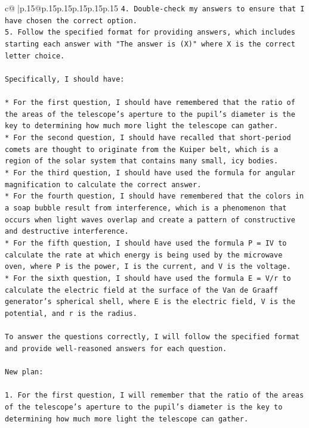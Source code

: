 \documentclass{article}
\begin{document}
{\begin{supertabular}{c@{$\;$}|p{.15\linewidth}@{}p{.15\linewidth}p{.15\linewidth}p{.15\linewidth}p{.15\linewidth}p{.15\linewidth}}
{{{\texttt{4. Double{-}check my answers to ensure that I have chosen the correct option.} \\
\texttt{5. Follow the specified format for providing answers, which includes starting each answer with "The answer is (X)" where X is the correct letter choice.} \\
\\ 
\texttt{Specifically, I should have:} \\
\\ 
\texttt{* For the first question, I should have remembered that the ratio of the areas of the telescope's aperture to the pupil's diameter is the key to determining how much more light the telescope can gather.} \\
\texttt{* For the second question, I should have recalled that short{-}period comets are thought to originate from the Kuiper belt, which is a region of the solar system that contains many small, icy bodies.} \\
\texttt{* For the third question, I should have used the formula for angular magnification to calculate the correct answer.} \\
\texttt{* For the fourth question, I should have remembered that the colors in a soap bubble result from interference, which is a phenomenon that occurs when light waves overlap and create a pattern of constructive and destructive interference.} \\
\texttt{* For the fifth question, I should have used the formula P = IV to calculate the rate at which energy is being used by the microwave oven, where P is the power, I is the current, and V is the voltage.} \\
\texttt{* For the sixth question, I should have used the formula E = V/r to calculate the electric field at the surface of the Van de Graaff generator's spherical shell, where E is the electric field, V is the potential, and r is the radius.} \\
\\ 
\texttt{To answer the questions correctly, I will follow the specified format and provide well{-}reasoned answers for each question.} \\
\\ 
\texttt{New plan:} \\
\\ 
\texttt{1. For the first question, I will remember that the ratio of the areas of the telescope's aperture to the pupil's diameter is the key to determining how much more light the telescope can gather.} \\
}}}
\end{supertabular}}
\end{document}
